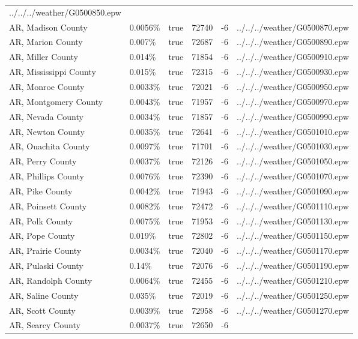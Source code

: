 \begin{longtable}[]{@{}llllll@{}}
../../../weather/G0500850.epw \\
AR, Madison County & 0.0056\% & true & 72740 & -6 &
../../../weather/G0500870.epw \\
AR, Marion County & 0.007\% & true & 72687 & -6 &
../../../weather/G0500890.epw \\
AR, Miller County & 0.014\% & true & 71854 & -6 &
../../../weather/G0500910.epw \\
AR, Mississippi County & 0.015\% & true & 72315 & -6 &
../../../weather/G0500930.epw \\
AR, Monroe County & 0.0033\% & true & 72021 & -6 &
../../../weather/G0500950.epw \\
AR, Montgomery County & 0.0043\% & true & 71957 & -6 &
../../../weather/G0500970.epw \\
AR, Nevada County & 0.0034\% & true & 71857 & -6 &
../../../weather/G0500990.epw \\
AR, Newton County & 0.0035\% & true & 72641 & -6 &
../../../weather/G0501010.epw \\
AR, Ouachita County & 0.0097\% & true & 71701 & -6 &
../../../weather/G0501030.epw \\
AR, Perry County & 0.0037\% & true & 72126 & -6 &
../../../weather/G0501050.epw \\
AR, Phillips County & 0.0076\% & true & 72390 & -6 &
../../../weather/G0501070.epw \\
AR, Pike County & 0.0042\% & true & 71943 & -6 &
../../../weather/G0501090.epw \\
AR, Poinsett County & 0.0082\% & true & 72472 & -6 &
../../../weather/G0501110.epw \\
AR, Polk County & 0.0075\% & true & 71953 & -6 &
../../../weather/G0501130.epw \\
AR, Pope County & 0.019\% & true & 72802 & -6 &
../../../weather/G0501150.epw \\
AR, Prairie County & 0.0034\% & true & 72040 & -6 &
../../../weather/G0501170.epw \\
AR, Pulaski County & 0.14\% & true & 72076 & -6 &
../../../weather/G0501190.epw \\
AR, Randolph County & 0.0064\% & true & 72455 & -6 &
../../../weather/G0501210.epw \\
AR, Saline County & 0.035\% & true & 72019 & -6 &
../../../weather/G0501250.epw \\
AR, Scott County & 0.0039\% & true & 72958 & -6 &
../../../weather/G0501270.epw \\
AR, Searcy County & 0.0037\% & true & 72650 & -6 &

\end{longtable}
